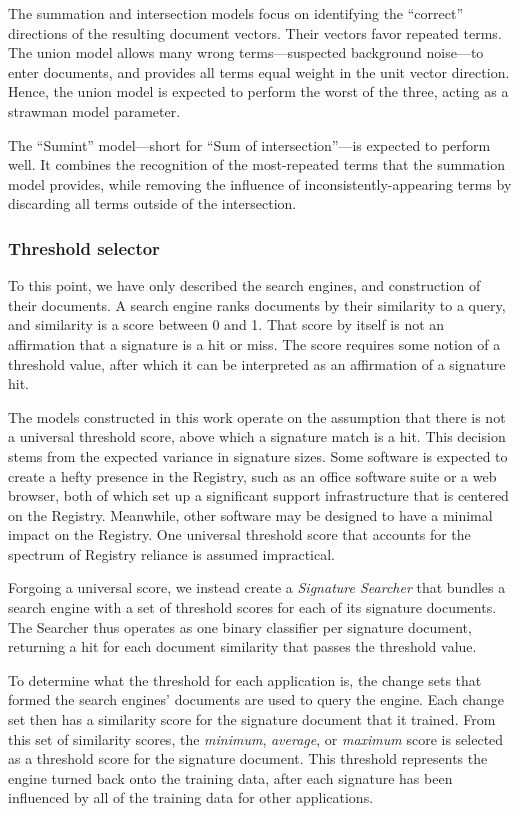 \documentclass[11pt]{ucthesis}
\theoremstyle{plain}
\theoremstyle{definition}
\begin{document}
The summation and intersection models focus on identifying the ``correct'' directions of the resulting document vectors.  Their vectors favor repeated terms.  The union model allows many wrong terms---suspected background noise---to enter documents, and provides all terms equal weight in the unit vector direction.  Hence, the union model is expected to perform the worst of the three, acting as a strawman model parameter.

The ``Sumint'' model---short for ``Sum of intersection''---is expected to perform well.  It combines the recognition of the most-repeated terms that the summation model provides, while removing the influence of inconsistently-appearing terms by discarding all terms outside of the intersection.


\subsubsection{Threshold selector}
\label{sec:threshold}

To this point, we have only described the search engines, and construction of their documents.  A search engine ranks documents by their similarity to a query, and similarity is a score between 0 and 1.  That score by itself is not an affirmation that a signature is a hit or miss.  The score requires some notion of a threshold value, after which it can be interpreted as an affirmation of a signature hit.

The models constructed in this work operate on the assumption that there is not a universal threshold score, above which a signature match is a hit.  This decision stems from the expected variance in signature sizes.  Some software is expected to create a hefty presence in the Registry, such as an office software suite or a web browser, both of which set up a significant support infrastructure that is centered on the Registry.  Meanwhile, other software may be designed to have a minimal impact on the Registry.  One universal threshold score that accounts for the spectrum of Registry reliance is assumed impractical.

Forgoing a universal score, we instead create a \emph{Signature Searcher} that bundles a search engine with a set of threshold scores for each of its signature documents.  The Searcher thus operates as one binary classifier per signature document, returning a hit for each document similarity that passes the threshold value.

To determine what the threshold for each application is, the change sets that formed the search engines' documents are used to query the engine.  Each change set then has a similarity score for the signature document that it trained.  From this set of similarity scores, the \emph{minimum}, \emph{average}, or \emph{maximum} score is selected as a threshold score for the signature document.  This threshold represents the engine turned back onto the training data, after each signature has been influenced by all of the training data for other applications.
\end{document}

